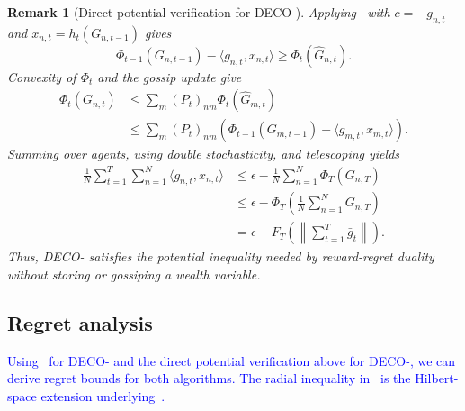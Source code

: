 \documentclass[journal]{IEEEtran}
\newtheorem{remark}{Remark}
\newcommand{\norm}[1]{\left\lVert{#1}\right\rVert}
\newcommand{\algname}{{DECO}\xspace}
\begin{document}
{\color{blue}
    \begin{remark}[Direct potential verification for \algname{}-]
        Applying~ with $c=-g_{n,t}$ and $x_{n,t}=h_t(G_{n,t-1})$ gives
        \begin{equation*}
            \Phi_{t-1}(G_{n,t-1})-\langle g_{n,t},x_{n,t}\rangle
            \geq\Phi_t(\widehat G_{n,t}).
        \end{equation*}
        Convexity of $\Phi_t$ and the gossip update give
        \begin{align*}
            \Phi_t(G_{n,t})
             & \leq\sum_m{(P_t)}_{nm}\Phi_t(\widehat G_{m,t}) \\
             & \leq\sum_m{(P_t)}_{nm}\left(
            \Phi_{t-1}(G_{m,t-1})-\langle g_{m,t},x_{m,t}\rangle
            \right).
        \end{align*}
        Summing over agents, using double stochasticity, and telescoping yields
        \begin{align*}
            \frac{1}{N}\sum_{t=1}^T\sum_{n=1}^{N}\langle g_{n,t},x_{n,t}\rangle
             & \leq\epsilon-\frac{1}{N}\sum_{n=1}^{N}\Phi_T(G_{n,T})            \\
             & \leq\epsilon-\Phi_T\left(\frac{1}{N}\sum_{n=1}^{N}G_{n,T}\right) \\
             & =\epsilon-F_T\left(\norm{\sum_{t=1}^T\bar g_t}\right).
        \end{align*}
        Thus, \algname{}- satisfies the potential inequality needed by reward-regret duality without storing or gossiping a wealth variable.
    \end{remark}
}

\subsection{Regret analysis}

\textcolor{blue}{Using~ for \algname{}- and the direct potential verification above for \algname{}-, we can derive regret bounds for both algorithms.}
\textcolor{blue}{The radial inequality in~ is the Hilbert-space extension underlying~\cite[Theorem 3]{orabona_coin_2016}.}
\end{document}
